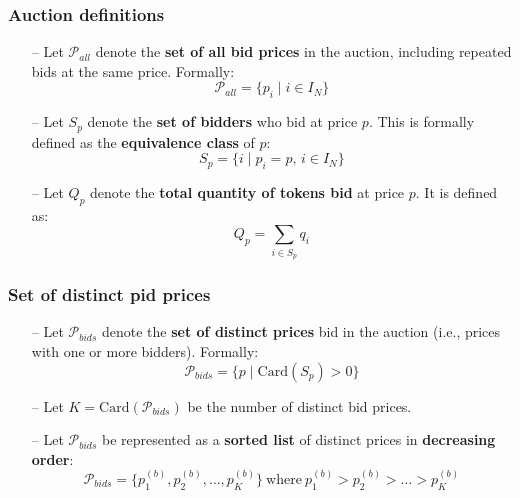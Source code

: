 \subsubsection*{Auction definitions}
\begin{itemize}
    \setlength\itemsep{0em}
    \item[--] Let $\mathcal{P}_{all}$ denote the \textbf{set of all bid prices} in the auction, including repeated bids at the same price. Formally:
    \begin{equation*}
        \mathcal{P}_{all} = \{ p_i \mid i \in I_N \}
    \end{equation*}
    \item[--] Let $S_p$ denote the \textbf{set of bidders} who bid at price $p$. This is formally defined as the \textbf{equivalence class} of $p$:
    \begin{equation*}
        S_p = \{ i \mid p_i = p, \, i \in I_N \}
    \end{equation*}   
    \item[--] Let $Q_p$ denote the \textbf{total quantity of tokens bid} at price $p$. It is defined as:
    \begin{equation*}
        Q_p = \sum_{i \in S_p} q_i
    \end{equation*}
\end{itemize}

\subsubsection*{Set of distinct pid prices}
\begin{itemize}
    \setlength\itemsep{0em}
    \item[--] Let $\mathcal{P}_{bids}$ denote the \textbf{set of distinct prices} bid in the auction (i.e., prices with one or more bidders). Formally:
    \begin{equation*}
        \mathcal{P}_{bids} = \{ p \mid \text{Card}(S_p) > 0 \}
    \end{equation*}
    \item[--] Let $K = \text{Card}(\mathcal{P}_{bids})$ be the number of distinct bid prices.
    \item[--] Let $\mathcal{P}_{bids}$ be represented as a \textbf{sorted list} of distinct prices in \textbf{decreasing order}: 
    \begin{equation*}
        \mathcal{P}_{bids} = \{ p_{1}^{(b)}, p_{2}^{(b)}, \dots, p_{K}^{(b)} \} \ \text{where} \ p_{1}^{(b)} > p_{2}^{(b)} > \dots > p_{K}^{(b)}
    \end{equation*}
\end{itemize}

